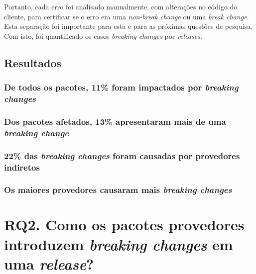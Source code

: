 Portanto, cada erro foi analisado manualmente, com alterações no código do cliente, para certificar se o erro era uma \textit{non-break change} ou uma \textit{break change}. Esta separação foi importante para esta e para as próximas questões de pesquisa. Com isto, foi quantificado os casos \textit{breaking changes} por \textit{releases}.


\subsection{Resultados}
\label{fin:rq1}

\subsubsection{De todos os pacotes, 11\% foram impactados por \textit{breaking changes}}

\subsubsection{Dos pacotes afetados, 13\% apresentaram mais de uma \textit{breaking change}}

\subsubsection{22\% das \textit{breaking changes} foram causadas por provedores indiretos}

\subsubsection{Os maiores provedores causaram mais \textit{breaking changes}}

\section{RQ2. Como os pacotes provedores introduzem \textit{breaking changes} em uma \textit{release}?}
\label{sec:rq2}

